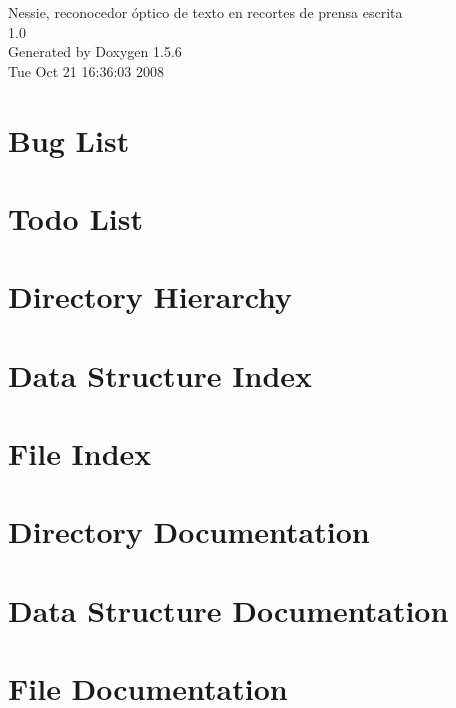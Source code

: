 \documentclass[a4paper]{book}
\begin{document}
\begin{titlepage}
\vspace*{7cm}
\begin{center}
{\Large Nessie, reconocedor óptico de texto en recortes de prensa escrita \\[1ex]\large 1.0 }\\
\vspace*{1cm}
{\large Generated by Doxygen 1.5.6}\\
\vspace*{0.5cm}
{\small Tue Oct 21 16:36:03 2008}\\
\end{center}
\end{titlepage}
\clearemptydoublepage
{}
\tableofcontents
\clearemptydoublepage
{}
\chapter{Bug List}
\label{bug}
\hypertarget{bug}{}

\chapter{Todo List}
\label{todo}
\hypertarget{todo}{}

\chapter{Directory Hierarchy}

\chapter{Data Structure Index}

\chapter{File Index}

\chapter{Directory Documentation}


\chapter{Data Structure Documentation}









\chapter{File Documentation}





















\printindex
\end{document}
